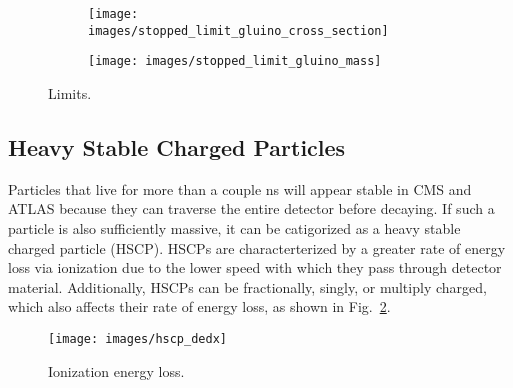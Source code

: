 \documentclass[12pt]{article}
\begin{document}
        \noindent \begin{figure}[htbp] \begin{center}
        \begin{subfigure}[htbp]{0.5\textwidth} \begin{center}
        \texttt{[image: images/stopped\_limit\_gluino\_cross\_section]}
        \end{center} \end{subfigure}
        \begin{subfigure}[htbp]{0.45\textwidth} \begin{center}
        \texttt{[image: images/stopped\_limit\_gluino\_mass]}
        \end{center} \end{subfigure}
        \caption{Limits.}
        \label{stopped_limits}
        \end{center} \end{figure}

    \subsection{Heavy Stable Charged Particles}
        Particles that live for more than a couple ns  will appear stable in CMS and ATLAS because they can traverse the entire detector before decaying. If such a particle is also sufficiently massive, it can be catigorized as a heavy stable charged particle (HSCP). HSCPs are characterterized by a greater rate of energy loss via ionization due to the lower speed with which they pass through detector material. Additionally, HSCPs can be fractionally, singly, or multiply charged, which also affects their rate of energy loss, as shown in Fig.~\ref{hscp_dedx}.

        \noindent \begin{figure}[htbp] \begin{center}
        \texttt{[image: images/hscp\_dedx]}
            \caption{Ionization energy loss.}
        \label{hscp_dedx}
        \end{center} \end{figure}
\end{document}
